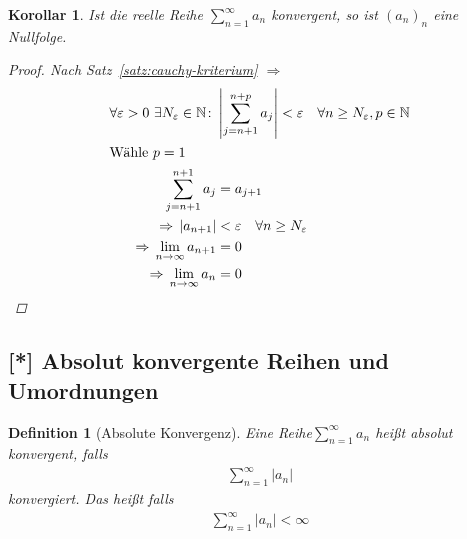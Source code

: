 \documentclass[11pt, twoside, a4paper]{article}
\theoremstyle{plain}
\newtheorem{definition}[blockelement]{Definition}
\newtheorem{korollar}[blockelement]{Korollar}
\newcommand{\abs}[1]{\left|#1\right|}
\newcommand{\impl}[0]{\Rightarrow{}}
\newcommand{\fromto}{\rightarrow{}}
\newcommand{\ntoinfty}[0]{n\fromto\infty}
\newcommand{\N}{\mathbb{N}}
\begin{document}
    \begin{korollar} %
        \label{korollar:folge-von-reihe-nullfolge}
        Ist die reelle Reihe $\sum_{n=1}^{\infty} a_n$ konvergent, so ist $(a_n)_n$ eine Nullfolge.
        \begin{proof}
            Nach Satz~\ref{satz:cauchy-kriterium} $\impl$
            \begin{align*}
                \forall \varepsilon > 0~\exists N_{\varepsilon}\in\N\colon &\abs{\sum_{j=n+1}^{n+p} a_j} < \varepsilon\quad\forall n\geq N_{\varepsilon}, p\in\N\\
                \intertext{Wähle $p=1$}
                \sum_{j=n+1}^{n+1} a_{j} &= a_{j+1}\\
                \impl \abs{a_{n+1}} &< \varepsilon\quad \forall n\geq N_{\varepsilon}\\
                \impl \lim_{\ntoinfty} a_{n+1} &= 0\\
                \impl \lim_{\ntoinfty} a_{n} &= 0\qedhere
            \end{align*}
        \end{proof}
    \end{korollar}

    \subsection{[*] Absolut konvergente Reihen und Umordnungen}

    \begin{definition}[Absolute Konvergenz] %
        Eine Reihe$\sum_{n=1}^{\infty} a_n$ heißt absolut konvergent, falls
        \begin{align*}
            \sum_{n=1}^{\infty} \abs{a_n}
        \end{align*}
        konvergiert. Das heißt falls
        \begin{align*}
            \sum_{n=1}^{\infty} \abs{a_n} < \infty
        \end{align*}
    \end{definition}
\end{document}
